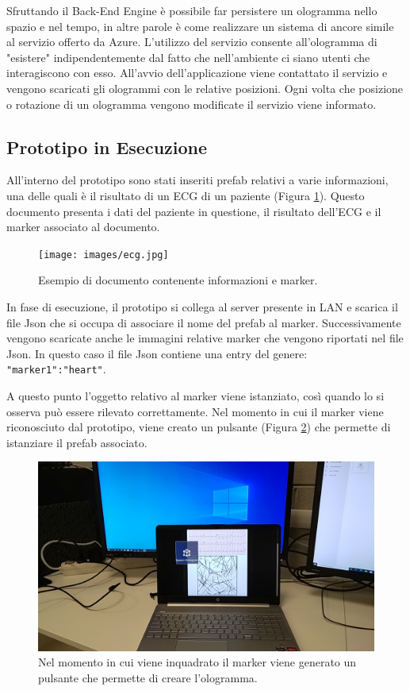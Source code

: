 Sfruttando il Back-End Engine è possibile far persistere un ologramma nello spazio e nel tempo, in altre parole è come realizzare un sistema di ancore simile al servizio offerto da Azure.
L'utilizzo del servizio consente all'ologramma di "esistere" indipendentemente dal fatto che nell'ambiente ci siano utenti che interagiscono con esso.
All'avvio dell'applicazione viene contattato il servizio e vengono scaricati gli ologrammi con le relative posizioni.
Ogni volta che posizione o rotazione di un ologramma vengono modificate il servizio viene informato.

\subsection{Prototipo in Esecuzione}
All'interno del prototipo sono stati inseriti prefab relativi a varie informazioni, una delle quali è il risultato di un ECG di un paziente (Figura \ref{fig:figure49}). Questo documento presenta i dati del paziente in questione, il risultato dell'ECG e il marker associato al documento.

\begin{figure}[H]
    \centering
    \texttt{[image: images/ecg.jpg]}
    \caption{Esempio di documento contenente informazioni e marker.}
    \label{fig:figure49}
\end{figure}

In fase di esecuzione, il prototipo si collega al server presente in LAN e scarica il file Json che si occupa di associare il nome del prefab al marker. Successivamente vengono scaricate anche le immagini relative marker che vengono riportati nel file Json.
In questo caso il file Json contiene una entry del genere: \texttt{"marker1":"heart"}.

A questo punto l'oggetto relativo al marker viene istanziato, così quando lo si osserva può essere rilevato correttamente.
Nel momento in cui il marker viene riconosciuto dal prototipo, viene creato un pulsante (Figura \ref{fig:figure410}) che permette di istanziare il prefab associato.
\begin{figure}[H]
    \centering
    \includegraphics[width=\textwidth]{images/ecg-marker-button.jpg}
    \caption{Nel momento in cui viene inquadrato il marker viene generato un pulsante che permette di creare l'ologramma.}
    \label{fig:figure410}
\end{figure}

